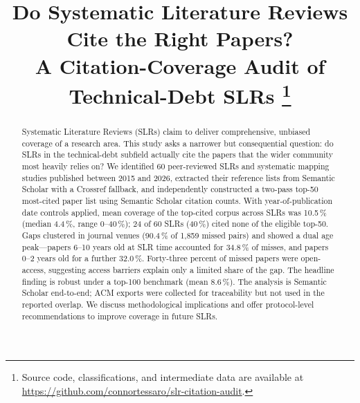 \documentclass[conference]{IEEEtran}
\begin{document}
\title{Do Systematic Literature Reviews Cite the Right Papers? \\
       A Citation-Coverage Audit of Technical-Debt SLRs%
       \thanks{Source code, classifications, and intermediate data are
       available at \url{https://github.com/connortessaro/slr-citation-audit}.}}

\author{%
}

\maketitle

\begin{abstract}
Systematic Literature Reviews (SLRs) claim to deliver comprehensive, unbiased
coverage of a research area. This study asks a narrower but consequential
question: do SLRs in the technical-debt subfield actually cite the papers
that the wider community most heavily relies on? We identified 60
peer-reviewed SLRs and systematic mapping studies published between 2015 and
2026, extracted their reference lists from Semantic Scholar with a Crossref
fallback, and independently constructed a two-pass top-50 most-cited paper
list using Semantic Scholar citation counts. With year-of-publication date
controls applied, mean coverage of the top-cited corpus across SLRs was
10.5\,\% (median 4.4\,\%, range 0--40\,\%); 24 of 60 SLRs (40\,\%) cited
none of the eligible top-50. Gaps clustered in journal venues (90.4\,\% of
1{,}859 missed pairs) and showed a dual age peak---papers 6--10 years old at
SLR time accounted for 34.8\,\% of misses, and papers 0--2 years old for a
further 32.0\,\%. Forty-three percent of missed papers were open-access,
suggesting access barriers explain only a limited share of the gap. The
headline finding is robust under a top-100 benchmark (mean 8.6\,\%). The
analysis is Semantic Scholar end-to-end; ACM exports were collected for
traceability but not used in the reported overlap. We discuss methodological
implications and offer protocol-level recommendations to improve coverage
in future SLRs.
\end{abstract}
\end{document}
